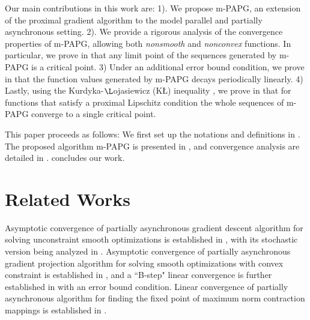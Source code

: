 \documentclass[leqno,onefignum,onetabnum]{siamart0516}
\newcommand{\KL}{K\L\xspace}
\newcommand{\mspg}{\textsf{m-PAPG}\xspace}
\begin{document}
Our main contributions in this work are: 1). We propose \mspg, an extension of the proximal gradient algorithm to the model parallel and partially asynchronous setting.
2). We provide a rigorous analysis of the convergence properties of \mspg, allowing both \emph{nonsmooth} and \emph{nonconvex} functions. In particular, we prove in  that any limit point of the sequences generated by \mspg is a critical point. 
3) Under an additional error bound condition, we prove in  that the function values generated by \mspg decays periodically linearly.
4) Lastly, using the Kurdyka-${\L}$ojasiewicz (\KL) inequality \cite{prox_alter_linear}, we prove in  that for functions that satisfy a proximal Lipschitz condition the whole sequences of \mspg converge to a single critical point.


This paper proceeds as follows: We first %
set up the notations and definitions in . The proposed algorithm \mspg is presented in , and convergence analysis are detailed in .  concludes our work.



%

\section{Related Works}\label{sec:related}
Asymptotic convergence of partially asynchronous gradient descent algorithm for solving unconstraint smooth optimizations is established in \cite{BT_parallel}, with its stochastic version being analyzed in \cite{BT_asy_gradient}. 
Asymptotic convergence of partially asynchronous gradient projection algorithm for solving smooth optimizations with convex constraint is established in  \cite{BT_parallel}, and a ``B-step" linear convergence is further established in \cite{Tseng_linear_PAA} with an error bound condition. Linear convergence of partially asynchronous algorithm for finding the fixed point of maximum norm contraction mappings is established in \cite{BT_asy, asy_iteration}.
\end{document}
